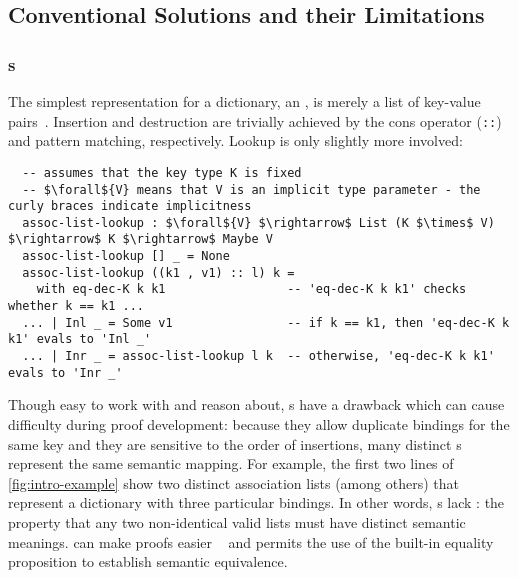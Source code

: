 \subsection{Conventional Solutions and their Limitations}



\subsubsection{\Sal{}s}

The simplest representation for a dictionary, an \emph{\sal}, is merely a list of key-value pairs~\citep[Lists]{Pierce:SF1}.
%
Insertion and destruction are trivially achieved by the cons operator (\texttt{::}) and pattern matching, respectively.
%
Lookup is only slightly more involved:
%
\begin{lstlisting}
  -- assumes that the key type K is fixed
  -- $\forall${V} means that V is an implicit type parameter - the curly braces indicate implicitness
  assoc-list-lookup : $\forall${V} $\rightarrow$ List (K $\times$ V) $\rightarrow$ K $\rightarrow$ Maybe V
  assoc-list-lookup [] _ = None
  assoc-list-lookup ((k1 , v1) :: l) k =
    with eq-dec-K k k1                 -- 'eq-dec-K k k1' checks whether k == k1 ...
  ... | Inl _ = Some v1                -- if k == k1, then 'eq-dec-K k k1' evals to 'Inl _'
  ... | Inr _ = assoc-list-lookup l k  -- otherwise, 'eq-dec-K k k1' evals to 'Inr _'
\end{lstlisting}


Though easy to work with and reason about, \sal{}s have a drawback which can cause difficulty during proof development:
%
because they allow duplicate bindings for the same key and they are sensitive to the order of insertions, many distinct \sal{}s represent the same semantic mapping.
%
For example, the first two lines of \autoref{fig:intro-example}
%
show two distinct association lists (among others) that represent a dictionary with three particular bindings.
%
In other words, \sal{}s lack \firstUseGoal{\Extensional}: the property that any two non-identical valid lists must have distinct semantic meanings.
%
\Extensional{} can make proofs easier ~\cite[Maps]{Pierce:SF1} and permits the use of the built-in equality proposition to establish semantic equivalence.
%

